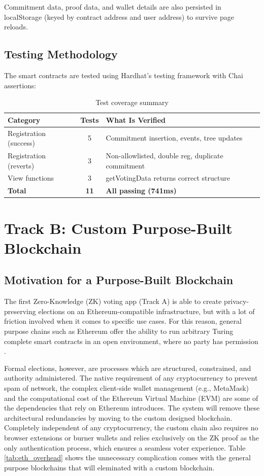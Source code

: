 \documentclass[12pt, a4paper]{report}
\begin{document}
Commitment data, proof data, and wallet details are also persisted in localStorage (keyed by contract address and user address) to survive page reloads.

\subsection{Testing Methodology}

The smart contracts are tested using Hardhat's testing framework with Chai assertions:

\begin{table}[H]
\centering
\caption{Test coverage summary}
\label{tab:tests}
\begin{tabular}{|l|c|p{5.5cm}|}
\hline
\textbf{Category} & \textbf{Tests} & \textbf{What Is Verified} \\ \hline
Registration (success) & 5 & Commitment insertion, events, tree updates \\ \hline
Registration (reverts) & 3 & Non-allowlisted, double reg, duplicate commitment \\ \hline
View functions & 3 & getVotingData returns correct structure \\ \hline
\textbf{Total} & \textbf{11} & \textbf{All passing (741ms)} \\ \hline
\end{tabular}
\end{table}

\newpage
\section{Track B: Custom Purpose-Built Blockchain}

\subsection{Motivation for a Purpose-Built Blockchain}

The first Zero-Knowledge (ZK) voting app (Track A) is able to create privacy-preserving elections on an Ethereum-compatible infrastructure, but with a lot of friction involved when it comes to specific use cases. For this reason, general purpose chains such as Ethereum offer the ability to run arbitrary Turing complete smart contracts in an open environment, where no party has permission \cite{buterin2014ethereum}.

Formal elections, however, are processes which are structured, constrained, and authority administered. The native requirement of any cryptocurrency to prevent spam of network, the complex client-side wallet management (e.g., MetaMask) and the computational cost of the Ethereum Virtual Machine (EVM) are some of the dependencies that rely on Ethereum introduces. The system will remove these architectural redundancies by moving to the custom designed blockchain. Completely independent of any cryptocurrency, the custom chain also requires no browser extensions or burner wallets and relies exclusively on the ZK proof as the only authentication process, which ensures a seamless voter experience. Table \ref{tab:eth_overhead} shows the unnecessary complication comes with the general purpose blockchains that will eleminated with a custom blockchain.
\end{document}
